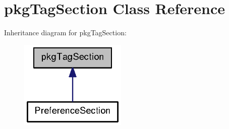 \section{pkg\-Tag\-Section \-Class \-Reference}
\label{classpkgTagSection}


\-Inheritance diagram for pkg\-Tag\-Section\-:
\nopagebreak
\begin{figure}[H]
\begin{center}
\leavevmode
\includegraphics[width=144pt]{classpkgTagSection__inherit__graph}
\end{center}
\end{figure}
